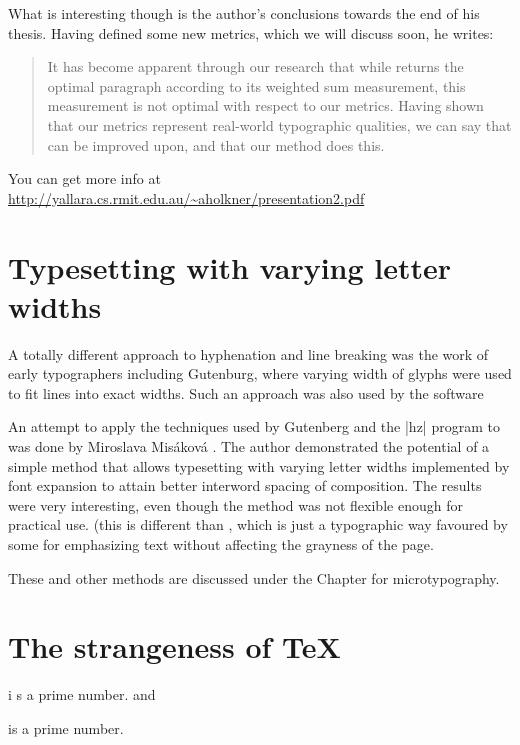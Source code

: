 {{{\begin{quote}
\end{quote}

What is interesting though is the author's conclusions towards the end of his thesis. Having defined some new metrics, which we will discuss soon, he writes:

\begin{quote}
It has become apparent through our research that while \tex returns the optimal paragraph according
to its weighted sum measurement, this measurement is not optimal with respect to our metrics.
Having shown that our metrics represent real-world typographic qualities, we can say that \tex can be
improved upon, and that our method does this.

\end{quote}

You can get more info at \url{http://yallara.cs.rmit.edu.au/~aholkner/presentation2.pdf}


\section{Typesetting with varying letter widths}
A totally different approach to hyphenation and line breaking was the work of early typographers including
Gutenburg, where varying width of glyphs were used to fit lines into exact widths. Such an approach was
also used by the  software\cite{hz}

An attempt to apply the techniques used by Gutenberg and the |hz| program to 
was done by Miroslava Mis\'akov\'a \cite{Miroslava1998}. The author demonstrated the potential of a simple
method that allows typesetting with varying letter widths implemented by font expansion
to attain better interword spacing of composition. The results were very interesting,
even though the method was not flexible enough for practical use. (this is different than , which
is just a typographic way favoured by some for emphasizing text without affecting the grayness of the page.

These and other methods are discussed under the Chapter for microtypography. 
\section{The strangeness of TeX}

{
 i s a prime number.
and

 is  a prime number.
}

}}}
